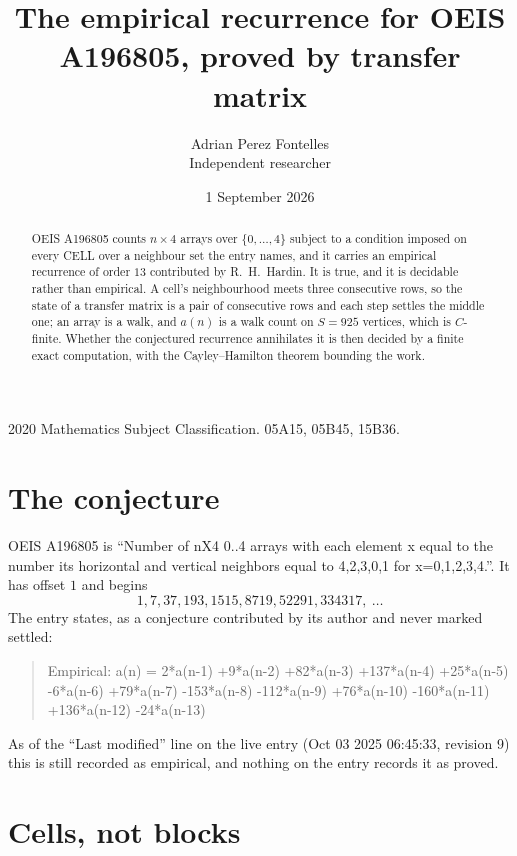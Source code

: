 \documentclass[11pt,a4paper]{article}
\title{The empirical recurrence for OEIS A196805, proved by transfer matrix}
\author{Adrian Perez Fontelles\\ \small Independent researcher}
\date{1 September 2026}
\theoremstyle{plain}
\theoremstyle{definition}
\begin{document}
\maketitle

\begin{abstract}
OEIS A196805 counts $n\times4$ arrays over $\{0,\dots,4\}$ subject to a condition imposed on
every CELL over a neighbour set the entry names, and it carries an empirical recurrence of
order $13$ contributed by R.~H.~Hardin. It is true, and it is decidable rather than
empirical. A cell's neighbourhood meets three consecutive rows, so the state of a transfer
matrix is a pair of consecutive rows and each step settles the middle one; an array is a
walk, and $a(n)$ is a walk count on $S=925$ vertices, which is $C$-finite. Whether the
conjectured recurrence annihilates it is then decided by a finite exact computation, with the
Cayley--Hamilton theorem bounding the work.
\end{abstract}

\noindent\small 2020 Mathematics Subject Classification. 05A15, 05B45, 15B36.\normalsize

\section{The conjecture}

OEIS A196805 is ``Number of nX4 0..4 arrays with each element x equal to the number its horizontal and vertical neighbors equal to 4,2,3,0,1 for x=0,1,2,3,4.''. It has offset $1$ and begins
\[
1, 7, 37, 193, 1515, 8719, 52291, 334317,\ \dots
\]
The entry states, as a conjecture contributed by its author and never marked settled:
\begin{quote}
Empirical: a(n) = 2*a(n-1) +9*a(n-2) +82*a(n-3) +137*a(n-4) +25*a(n-5) -6*a(n-6) +79*a(n-7) -153*a(n-8) -112*a(n-9) +76*a(n-10) -160*a(n-11) +136*a(n-12) -24*a(n-13)
\end{quote}
As of the ``Last modified'' line on the live entry (Oct 03 2025 06:45:33, revision 9) this is still
recorded as empirical, and nothing on the entry records it as proved.

\section{Cells, not blocks}
\end{document}
